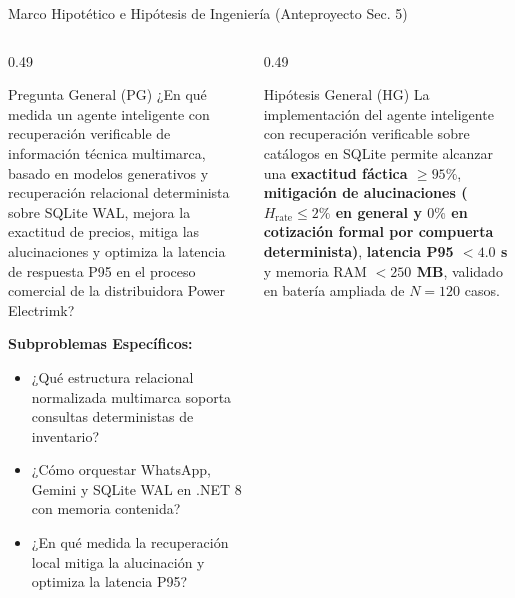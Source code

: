\documentclass[aspectratio=169, 10pt]{beamer}
\begin{document}
\begin{frame}{Marco Hipotético e Hipótesis de Ingeniería (Anteproyecto Sec. 5)}
  \begin{columns}[t]
    \begin{column}{0.49\textwidth}
      \begin{block}{Pregunta General (PG)}
        \scriptsize
        ¿En qué medida un agente inteligente con recuperación verificable de información técnica multimarca, basado en modelos generativos y recuperación relacional determinista sobre SQLite WAL, mejora la exactitud de precios, mitiga las alucinaciones y optimiza la latencia de respuesta P95 en el proceso comercial de la distribuidora Power Electrimk?
      \end{block}
      
      \vspace{0.05cm}
      {\footnotesize \textbf{Subproblemas Específicos:}}
      \begin{itemize}\scriptsize\setlength{\itemsep}{2pt}
        \item[\textbf{P1.}] ¿Qué estructura relacional normalizada multimarca soporta consultas deterministas de inventario?
        \item[\textbf{P2.}] ¿Cómo orquestar WhatsApp, Gemini y SQLite WAL en .NET 8 con memoria contenida?
        \item[\textbf{P3.}] ¿En qué medida la recuperación local mitiga la alucinación y optimiza la latencia P95?
      \end{itemize}
    \end{column}
    
    \begin{column}{0.49\textwidth}
      \begin{exampleblock}{Hipótesis General (HG)}
        \scriptsize
        La implementación del agente inteligente con recuperación verificable sobre catálogos en SQLite permite alcanzar una \textbf{exactitud fáctica $\ge 95\%$}, \textbf{mitigación de alucinaciones ($H_{\text{rate}} \le 2\%$ en general y $0\%$ en cotización formal por compuerta determinista)}, \textbf{latencia P95 $< 4.0$ s} y memoria RAM \textbf{$< 250$ MB}, validado en batería ampliada de $N=120$ casos.
      \end{exampleblock}
      

\end{column}
\end{columns}
\end{frame}
\end{document}
